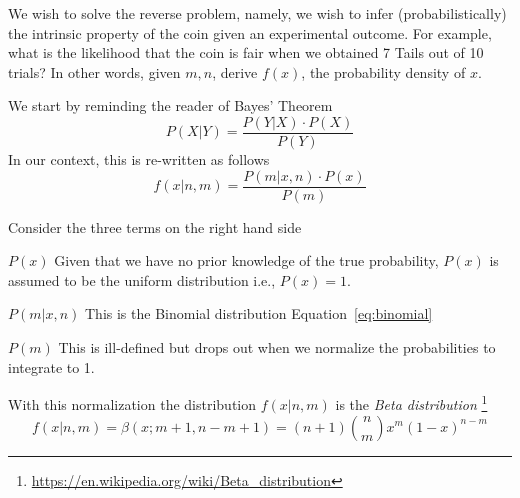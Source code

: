 \documentclass[letterpaper,12pt]{article}
\begin{document}
We wish to solve the reverse problem, namely, we wish to infer
(probabilistically) the intrinsic property of the coin given an
experimental outcome. For example, what is the likelihood that the
coin is fair when we obtained 7 Tails out of 10 trials? In other
words, given \(m, n\), derive \(f(x)\), the probability density
of \(x\).

We start by reminding the reader of Bayes' Theorem
\begin{equation}
\label{eq:bayes_theorem}
P(X|Y) = \frac{P(Y|X) \cdot P(X)}{P(Y)}
\end{equation}
In our context, this is re-written as follows
\begin{equation}
\label{eq:bayes_theorem_m_n}
f(x|n,m) = \frac{P(m|x,n)\cdot P(x)}{P(m)}
\end{equation}

Consider the three terms on the right hand side
\bd
\item  [\(P(x)\)] 
Given that we have no prior knowledge of the true probability,
\(P(x)\) is assumed to be the uniform distribution i.e., \(P(x)
=1\). 
\item [\(P(m|x, n)\)] This is the Binomial distribution
  Equation~\ref{eq:binomial}
\item [\(P(m)\)] This is ill-defined but drops out when we normalize
  the probabilities to integrate to 1.
\ed

With this normalization the distribution \(f(x|n,m)\) is the {\em Beta
distribution}
\footnote{\url{https://en.wikipedia.org/wiki/Beta_distribution}}
\begin{equation}
\label{eq:beta_for_m_n}
f(x|n,m) =\beta(x; m+1, n-m+1) = (n+1) {n\choose m}x^m (1-x)^{n-m}
\end{equation}
\end{document}
